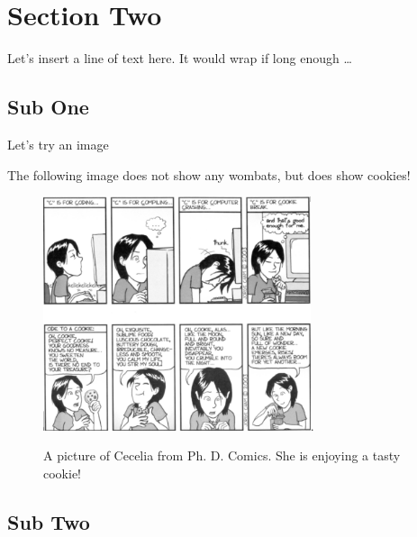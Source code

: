 \documentclass[12pt]{article} %
\begin{document}
\section{Section Two}

Let's insert a line of text here. It would wrap if long enough \ldots

\subsection{Sub One}

Let's try an image

The following image does not show any wombats, but does show cookies!



\begin{figure}[h!]
\begin{center}
\includegraphics[width=0.7\textwidth]{./images/cookie.png}.
\caption{A picture of Cecelia from Ph. D. Comics. She is enjoying a tasty cookie!}
\end{center}
\end{figure}




\subsection{Sub Two}
\end{document}
